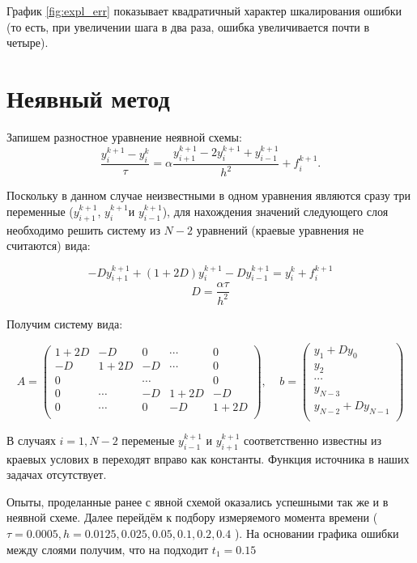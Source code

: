 График \ref{fig:expl_err} показывает квадратичный характер шкалирования ошибки (то есть, при увеличении шага в два раза, ошибка увеличивается почти в четыре).

\newpage
\section{Неявный метод}

Запишем разностное уравнение неявной схемы:
$$\dfrac{y_i^{k+1} - y_i^{k}}{\tau} = \alpha \dfrac{y_{i+1}^{k+1} - 2 y_i^{k+1} + y_{i-1}^{k+1}}{h^2} + f_i^{k+1}.$$

Поскольку в данном случае неизвестными в одном уравнения являются сразу три переменные ($y_{i+1}^{k+1}$, $y_i^{k+1}$и $y_{i-1}^{k+1}$), для нахождения значений следующего слоя необходимо решить систему из $N-2$ уравнений (краевые уравнения не считаются) вида:

\[ -D y_{i+1}^{k+1}  + (1 + 2 D)y_i^{k+1} - D y_{i-1}^{k+1} = y_i^k + f^{k+1}_i\]
\[ D =  \frac{\alpha \tau}{h^2} \]

Получим систему вида:

\begin{equation*}
 A = 
 \begin{pmatrix}
	1+2D & -D & 0 & \cdots & 0 \\
	-D & 1+2D & -D & \cdots & 0 \\
	0 &  & \cdots &  &  0 \\
	0 & \cdots & -D & 1+2D & -D \\
	0 & \cdots & 0 & -D & 1+2D\\
 \end{pmatrix},
 \ \ \ \ \ b = 
 \begin{pmatrix}
  y_1 + D y_0 \\
  y_2 \\
  \cdots \\
  y_{N-3} \\
  y_{N-2} + D y_{N-1} \\
 \end{pmatrix}
\end{equation*}

В случаях $i=1, N-2$ переменые $y_{i-1}^{k+1}$ и $y_{i+1}^{k+1}$ соответственно известны из краевых услових в переходят вправо как константы. Функция источника в наших задачах отсутствует.

Опыты, проделанные ранее с явной схемой оказались успешными так же и в неявной схеме. Далее перейдём к подбору измеряемого момента времени ($\tau=0.0005, h=0.0125, 0.025, 0.05, 0.1, 0.2, 0.4$ ). На основании графика ошибки между слоями получим, что на подходит $t_1=0.15$

